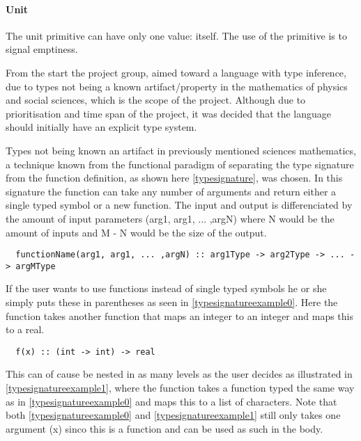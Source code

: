 \paragraph{Unit}
\label{sec:unit}

The unit primitive can have only one value: itself. The use of the primitive is to signal emptiness.

From the start the project group, aimed toward a language with type inference, due to types not being a known artifact/property in the mathematics of physics and social sciences, which is the scope of the project. Although due to prioritisation and time span of the project, it was decided that the language should initially have an explicit type system.

Types not being known an artifact in previously mentioned sciences mathematics, a technique known from the functional paradigm of separating the type signature from the function definition, as shown here \cref{typesignature}, was chosen. In this signature the function can take any number of arguments and return either a single typed symbol or a new function. The input and output is differenciated by the amount of input parameters (arg1, arg1, ... ,argN) where N would be the amount of inputs and M - N would be the size of the output.

\begin{verbatim}
  functionName(arg1, arg1, ... ,argN) :: arg1Type -> arg2Type -> ... -> argMType
\end{verbatim}
\label{typesignature}

If the user wants to use functions instead of single typed symbols he or she simply puts these in parentheses as seen in \cref{typesignatureexample0}. Here the function takes another function that maps an integer to an integer and maps this to a real.

\begin{verbatim}
  f(x) :: (int -> int) -> real
\end{verbatim}
\label{typesignatureexample0}

This can of cause be nested in as many levels as the user decides as illustrated in \cref{typesignatureexample1}, where the function takes a function typed the same way as in \cref{typesignatureexample0} and maps this to a list of characters. Note that both \cref{typesignatureexample0} and \cref{typesignatureexample1} still only takes one argument (x) sinco this is a function and can be used as such in the body.

